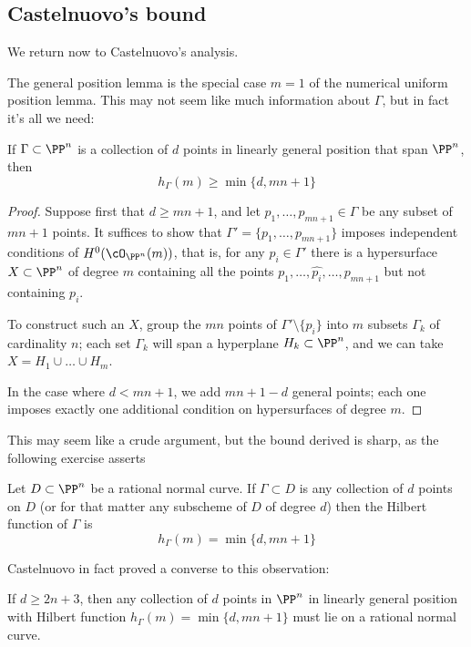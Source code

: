 \subsection{Castelnuovo's bound}

We return now to Castelnuovo's analysis.

The general position lemma is the special case $m=1$ of the numerical uniform position lemma. This may not seem like much information about $\Gamma$, but in fact it's all we need:

\begin{proposition}\label{min hilb}
If $\Gamma \subset \PP^n$ is a collection of $d$ points in linearly general position that span $\PP^n$, then 
$$
h_\Gamma(m) \geq \min\{d, mn+1\}
$$
\end{proposition}

\begin{proof}
Suppose first that $d \geq mn+1$, and let $p_1,\dots,p_{mn+1} \in \Gamma$ be any subset of $mn+1$ points. It suffices to show that $\Gamma' = \{p_1,\dots,p_{mn+1}\}$ imposes independent conditions of $H^0(\cO_{\PP^n}(m))$, that is, for any $p_i \in \Gamma'$ there is a hypersurface $X \subset \PP^n$ of degree $m$ containing all the points $p_1,\dots, \hat{p_i},\dots,p_{mn+1}$ but not containing $p_i$.

To construct such an $X$, group the $mn$ points of $\Gamma' \setminus \{p_i\}$ into $m$ subsets $\Gamma_k$ of cardinality $n$; each set $\Gamma_k$ will span a hyperplane $H_k \subset \PP^n$, and we can take $X = H_1 \cup \dots \cup H_m$. 

In the case where $d<mn+1$, we add $mn+1-d$ general points; each one imposes exactly one
additional condition on hypersurfaces of degree $m$.
\end{proof}

This may seem like a crude argument, but the bound derived is sharp, as the following exercise asserts

\begin{exercise}
Let $D \subset \PP^n$ be a rational normal curve. If $\Gamma \subset D$ is any collection of $d$ points on $D$ (or for that matter any subscheme of $D$ of degree $d$) then the Hilbert function of $\Gamma$ is
$$
h_\Gamma(m) = \min\{d, mn+1\}
$$
\end{exercise} 

Castelnuovo in fact proved a converse to this observation:

\begin{fact}
If $d \geq 2n+3$, then any collection of $d$ points in $\PP^n$ in linearly general position with Hilbert function $h_\Gamma(m) = \min\{d, mn+1\}$ must lie on a rational normal curve. 
\end{fact}

